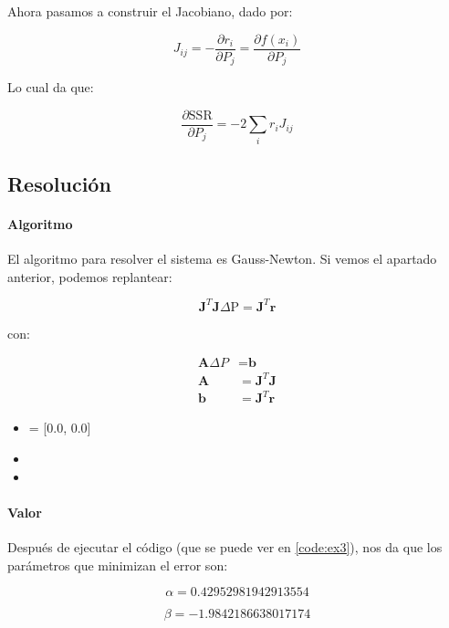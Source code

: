 Ahora pasamos a construir el Jacobiano, dado por:

\begin{equation}
	J_{ij} = - \frac{\partial r_i}{\partial P_j} = \frac{\partial f(x_i)}{\partial P_j} 
\end{equation}


Lo cual da que:

\begin{equation}
	\frac{ \partial \text{SSR} }{ \partial P_j } = -2 \sum_i r_i J_{ij}
\end{equation}


\subsection{Resolución}

\paragraph{Algoritmo}

El algoritmo para resolver el sistema es Gauss-Newton. Si vemos el apartado anterior, podemos replantear:

\begin{equation*}
	\textbf{J}^T\textbf{J} \Delta \text{P} = \textbf{J}^T  \textbf{r}
\end{equation*}

con:

\begin{align*}
	\textbf{A} \Delta P &= \textbf{b} \\
	\textbf{A} &= \textbf{J}^T\textbf{J} \\
	\textbf{b} &= \textbf{J}^T  \textbf{r}
\end{align*}

\begin{itemize}
	\item {} = [0.0, 0.0]
	\item {}
	\item {} 
\end{itemize}

\paragraph{Valor} Después de ejecutar el código (que se puede ver en \ref{code:ex3}), nos da que los parámetros que minimizan el error son:

$$\alpha = 0.42952981942913554$$

$$\beta = -1.9842186638017174$$